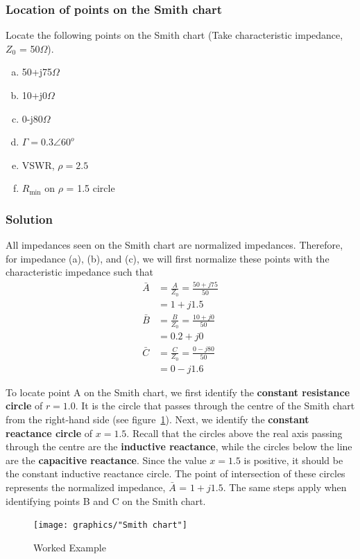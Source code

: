 \begin{exmp}\label{exmp:locatepoints}
\subsubsection*{Location of points on the Smith chart}
Locate the following points on the Smith chart (Take characteristic impedance, $Z_{0}$ = 50$\Omega$).

\begin{enumerate}[(a)]
\item 50+j75$\varOmega$
\item 10+j0$\varOmega$
\item 0-j80$\varOmega$
\item $\Gamma=0.3\angle60^o$
\item VSWR, $\rho=2.5$
\item $R_\min$ on $\rho$ = 1.5 circle
\end{enumerate}

\subsubsection*{Solution}
All impedances seen on the Smith chart are normalized impedances. Therefore, for impedance (a), (b), and (c), we will first normalize these points with the characteristic impedance such that
\begin{align*}
\bar{A}&=\frac{A}{Z_{0}}
=\frac{50 + j75}{50}\\
&=1+j1.5\\
\bar{B}&=\frac{B}{Z_{0}}
= \frac{10 + j0}{50}\\
&=0.2+j0\\
\bar{C}&=\frac{C}{Z_{0}}
= \frac{0 - j80}{50}\\
&=0-j1.6
\end{align*}

To locate point A on the Smith chart, we first identify the \textbf{constant resistance circle} of $r = 1.0$. It is the circle that passes through the centre of the Smith chart from the right-hand side (see figure~\ref{fig:workedexample1}). Next, we identify the \textbf{constant reactance circle} of $x = 1.5$. Recall that the circles above the real axis passing through the centre are the \textbf{inductive reactance}, while the circles below the line are the \textbf{capacitive reactance}. Since the value $x = 1.5$ is positive, it should be the constant inductive reactance circle. The point of intersection of these circles represents the normalized impedance, $\bar{A}$ =  $1 + j1.5$. The same steps apply when identifying points B and C on the Smith chart.
\begin{figure}[h]
\centering
\texttt{[image: graphics/"Smith chart"]}
\caption{Worked Example}
\label{fig:workedexample1}
\end{figure}


\end{exmp}
